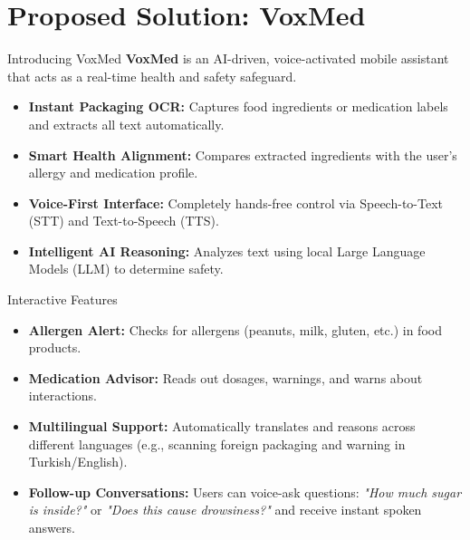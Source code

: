 \section{Proposed Solution: VoxMed}

\begin{frame}{Introducing VoxMed}
    \textbf{VoxMed} is an AI-driven, voice-activated mobile assistant that acts as a real-time health and safety safeguard.
    \vspace{0.3cm}
    \begin{itemize}
        \item \textbf{Instant Packaging OCR:} Captures food ingredients or medication labels and extracts all text automatically.
        \item \textbf{Smart Health Alignment:} Compares extracted ingredients with the user's allergy and medication profile.
        \item \textbf{Voice-First Interface:} Completely hands-free control via Speech-to-Text (STT) and Text-to-Speech (TTS).
        \item \textbf{Intelligent AI Reasoning:} Analyzes text using local Large Language Models (LLM) to determine safety.
    \end{itemize}
\end{frame}

\begin{frame}{Interactive Features}
    \begin{itemize}
        \item \textbf{Allergen Alert:} Checks for allergens (peanuts, milk, gluten, etc.) in food products.
        \item \textbf{Medication Advisor:} Reads out dosages, warnings, and warns about interactions.
        \item \textbf{Multilingual Support:} Automatically translates and reasons across different languages (e.g., scanning foreign packaging and warning in Turkish/English).
        \item \textbf{Follow-up Conversations:} Users can voice-ask questions: \textit{"How much sugar is inside?"} or \textit{"Does this cause drowsiness?"} and receive instant spoken answers.
    \end{itemize}
\end{frame}
